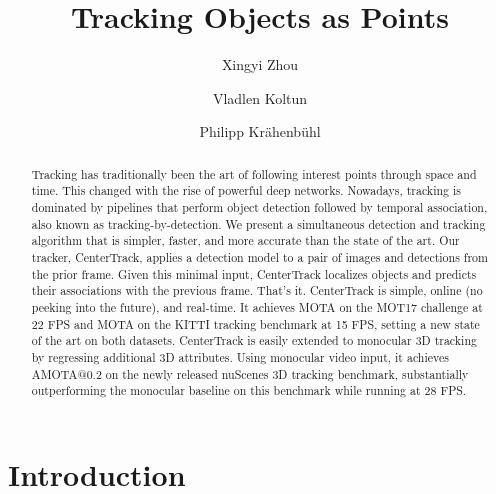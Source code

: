 \documentclass[runningheads]{llncs}
\begin{document}
\pagestyle{headings}
\mainmatter
\def\ECCVSubNumber{****}  

\title{Tracking Objects as Points} 

\begin{comment}
\titlerunning{ECCV-20 submission ID \ECCVSubNumber} 
\authorrunning{ECCV-20 submission ID \ECCVSubNumber} 
\author{Anonymous ECCV submission}
\institute{Paper ID \ECCVSubNumber}
\end{comment}


\author{Xingyi Zhou \and
Vladlen Koltun \and
Philipp Kr\"ahenb\"uhl}
\maketitle

\begin{abstract}
Tracking has traditionally been the art of following interest points through space and time. This changed with the rise of powerful deep networks. Nowadays, tracking is dominated by pipelines that perform object detection followed by temporal association, also known as tracking-by-detection. We present a simultaneous detection and tracking algorithm that is simpler, faster, and more accurate than the state of the art. Our tracker, CenterTrack, applies a detection model to a pair of images and detections from the prior frame. Given this minimal input, CenterTrack localizes objects and predicts their associations with the previous frame. That's it. CenterTrack is simple, online (no peeking into the future), and real-time. It achieves  MOTA on the MOT17 challenge at 22 FPS and  MOTA on the KITTI tracking benchmark at 15 FPS, setting a new state of the art on both datasets. CenterTrack is easily extended to monocular 3D tracking by regressing additional 3D attributes. Using monocular video input, it achieves  AMOTA@0.2 on the newly released nuScenes 3D tracking benchmark, substantially outperforming the monocular baseline on this benchmark while running at 28 FPS.
\end{abstract}

\section{Introduction}
\end{document}
